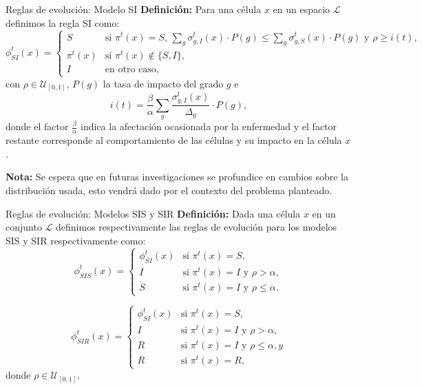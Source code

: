 \documentclass[9pt]{beamer}
\begin{document}
\begin{frame}{Reglas de evolución: Modelo SI}
\textbf{Definición:} Para una célula $x$ en un espacio $\mathcal{L}$ definimos la regla SI como:
\begin{equation}
    \phi_{SI}^t(x)=\left\{\begin{array}{ll}
        S & \text{si }\pi^t(x)=S\text{, }\sum_g{\sigma_{g,I}^t(x)\cdot P(g)}\leq \sum_g{\sigma_{g,S}^t(x)\cdot P(g)}\text{ y }\rho\geq i(t),\\
        \pi^t(x) & \text{si }\pi^t(x)\notin\{S,I\}\text{,} \\
        I & \text{en otro caso,}
    \end{array}\right.
\end{equation}
con $\rho\in\mathcal{U}_{[0,1]}$, $P(g)$ la tasa de impacto del grado $g$ e
\begin{equation}
    i(t) = \frac{\beta}{\alpha}\sum_g{\frac{\sigma_{g,I}^t(x)}{\Delta_g}}\cdot P(g),
\end{equation}
donde el factor $\frac{\beta}{\alpha}$ indica la afectación ocasionada por la enfermedad y el factor restante corresponde al comportamiento de las células y su impacto en la célula $x$.

\textbf{Nota:} Se espera que en futuras investigaciones se profundice en cambios sobre la distribución usada, esto vendrá dado por el contexto del problema planteado.
\end{frame}

\begin{frame}{Reglas de evolución: Modelos SIS y SIR}
\textbf{Definición:} Dada una célula $x$ en un conjunto $\mathcal{L}$ definimos respectivamente las reglas de evolución para los modelos SIS y SIR respectivamente como:
\begin{equation}
    \phi_{SIS}^t(x)=\left\{\begin{array}{ll}
        \phi_{SI}^t(x) & \text{si }\pi^t(x) = S,\\
        I & \text{si }\pi^t(x)=I\text{ y }\rho>\alpha,\\
        S & \text{si }\pi^t(x)=I\text{ y }\rho\leq\alpha.
    \end{array}\right.
\end{equation}

\begin{equation}
    \phi_{SIR}^t(x)=\left\{\begin{array}{ll}
        \phi_{SI}^t(x) & \text{si }\pi^t(x) = S,\\
        I & \text{si }\pi^t(x)=I\text{ y }\rho>\alpha,\\
        R & \text{si }\pi^t(x)=I\text{ y }\rho\leq\alpha, y \\
        R & \text{si }\pi^t(x)=R,
    \end{array}\right.
\end{equation}
donde $\rho\in\mathcal{U}_{[0,1]}$.
\end{frame}
\end{document}
